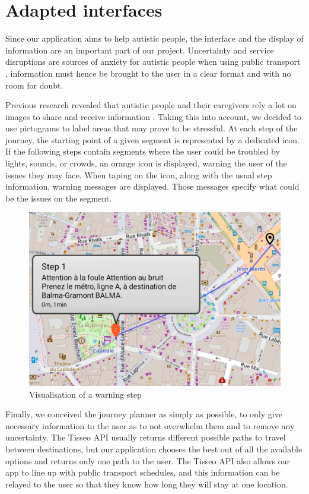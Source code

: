 \section{Adapted interfaces}


Since our application aims to help autistic people, the interface and the display of information are an important part of our project. Uncertainty and service disruptions are sources of anxiety for autistic people when using public transport \cite{2020ExperiencesYoungAutistic}, information must hence be brought to the user in a clear format and with no room for doubt.


Previous research revealed that autistic people and their caregivers rely a lot on images to share and receive information \cite{2018MobilityPoliciesExtraSmall}. Taking this into account, we decided to use pictograms to label areas that may prove to be stressful. At each step of the journey, the starting point of a given segment is represented by a dedicated icon. If the following steps contain segments where the user could be troubled by lights, sounds, or crowds, an orange icon is displayed, warning the user of the issues they may face. When taping on the icon, along with the usual step information, warning messages are displayed. Those messages specify what could be the issues on the segment.


\begin{figure}[h]
    \centering
    \includegraphics[scale=0.3]{img/step warning.png}
    \caption{Visualisation of a warning step}
    \label{fig:WarningStep}
\end{figure}


Finally, we conceived the journey planner as simply as possible, to only give necessary information to the user as to not overwhelm them and to remove any uncertainty. The Tisseo API usually returns different possible paths to travel between destinations, but our application chooses the best out of all the available options and returns only one path to the user. The Tisseo API also allows our app to line up with public transport schedules, and this information can be relayed to the user so that they know how long they will stay at one location.
